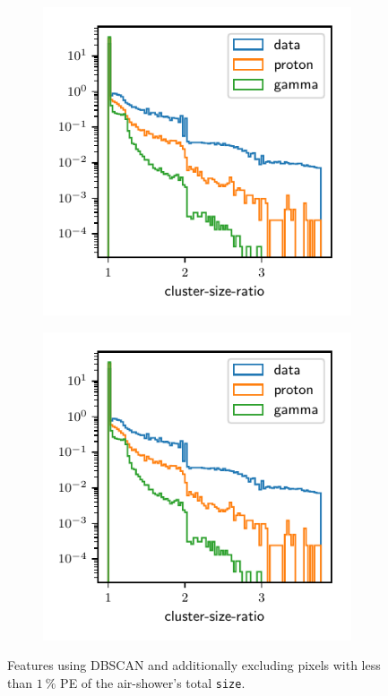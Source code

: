 \begin{figure}
\begin{subfigure}{0.5\textwidth}
  \end{subfigure}
  \begin{subfigure}{0.5\textwidth}
    \includegraphics[width=\textwidth, page=15]{Plots/data_mc/features_DBSCAN_perc.pdf}
  \end{subfigure}
  \begin{subfigure}{0.5\textwidth}
    \includegraphics[width=\textwidth, page=9]{Plots/data_mc/features_DBSCAN_perc.pdf}
  \end{subfigure}
  \caption{Features using DBSCAN and additionally excluding pixels with less than $\SI{1}{\percent}$ PE of the air-shower's total \texttt{size}.}
  \label{fig:feat_dbscan_perc}
\end{figure}


